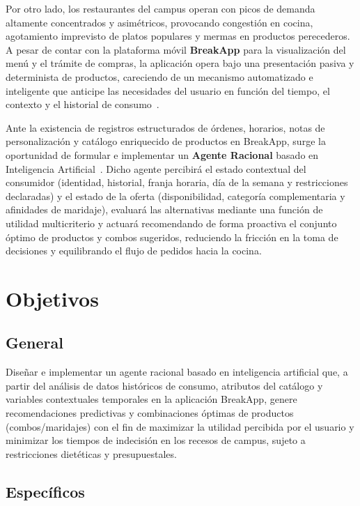 \documentclass{article}
\begin{document}
Por otro lado, los restaurantes del campus operan con picos de demanda altamente concentrados y asimétricos, provocando congestión en cocina, agotamiento imprevisto de platos populares y mermas en productos perecederos. A pesar de contar con la plataforma móvil \textbf{BreakApp} para la visualización del menú y el trámite de compras, la aplicación opera bajo una presentación pasiva y determinista de productos, careciendo de un mecanismo automatizado e inteligente que anticipe las necesidades del usuario en función del tiempo, el contexto y el historial de consumo~\cite{burke2002hybrid}.

Ante la existencia de registros estructurados de órdenes, horarios, notas de personalización y catálogo enriquecido de productos en BreakApp, surge la oportunidad de formular e implementar un \textbf{Agente Racional} basado en Inteligencia Artificial~\cite{russell2020artificial}. Dicho agente percibirá el estado contextual del consumidor (identidad, historial, franja horaria, día de la semana y restricciones declaradas) y el estado de la oferta (disponibilidad, categoría complementaria y afinidades de maridaje), evaluará las alternativas mediante una función de utilidad multicriterio y actuará recomendando de forma proactiva el conjunto óptimo de productos y combos sugeridos, reduciendo la fricción en la toma de decisiones y equilibrando el flujo de pedidos hacia la cocina.

\section{Objetivos}

\subsection{General}

Diseñar e implementar un agente racional basado en inteligencia artificial que, a partir del análisis de datos históricos de consumo, atributos del catálogo y variables contextuales temporales en la aplicación BreakApp, genere recomendaciones predictivas y combinaciones óptimas de productos (combos/maridajes) con el fin de maximizar la utilidad percibida por el usuario y minimizar los tiempos de indecisión en los recesos de campus, sujeto a restricciones dietéticas y presupuestales.

\subsection{Específicos}
\end{document}
